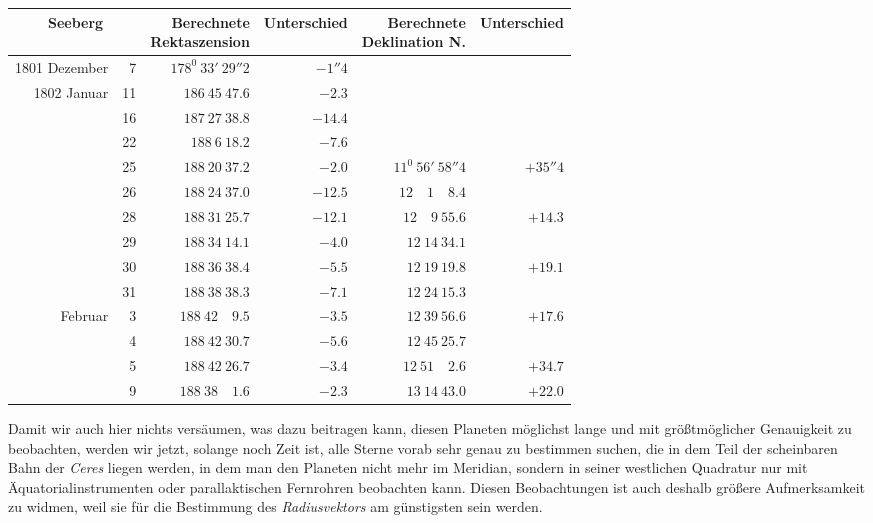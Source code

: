 \begin{center}
{\small\setlength{\tabcolsep}{4pt}
\begin{tabular}{r r|r|r|r|r}
\multicolumn{2}{c|}{Seeberg}&\shortstack{Berechnete\\Rektaszension}&Unterschied&\shortstack{Berechnete\\Deklination N.}&Unterschied\\\hline
1801 Dezember&7&$178^0\ 33'\ 29''2$&$-1''4$&&\\
1802 Januar&11&$186\ 45\ 47.6$&$-2.3$&&\\
&16&$187\ 27\ 38.8$&$-14.4$&&\\
&22&$188\ 6\ 18.2$&$-7.6$&&\\
&25&$188\ 20\ 37.2$&$-2.0$&$11^0\ 56'\ 58''4$&$+35''4$\\
&26&$188\ 24\ 37.0$&$-12.5$&$12\quad1\quad8.4$&\\
&28&$188\ 31\ 25.7$&$-12.1$&$12\quad9\ 55.6$&$+14.3$\\
&29&$188\ 34\ 14.1$&$-4.0$&$12\ 14\ 34.1$&\\
&30&$188\ 36\ 38.4$&$-5.5$&$12\ 19\ 19.8$&$+19.1$\\
&31&$188\ 38\ 38.3$&$-7.1$&$12\ 24\ 15.3$&\\
Februar&3&$188\ 42\quad9.5$&$-3.5$&$12\ 39\ 56.6$&$+17.6$\\
&4&$188\ 42\ 30.7$&$-5.6$&$12\ 45\ 25.7$&\\
&5&$188\ 42\ 26.7$&$-3.4$&$12\ 51\quad2.6$&$+34.7$\\
&9&$188\ 38\quad1.6$&$-2.3$&$13\ 14\ 43.0$&$+22.0$
\end{tabular}}
\end{center}
\expandafter\def\csname HistoricalNoteText18\endcsname{Damit wir auch hier nichts versäumen, was dazu beitragen kann, diesen Planeten möglichst lange und mit größtmöglicher Genauigkeit zu beobachten, werden wir jetzt, solange noch Zeit ist, alle Sterne vorab sehr genau zu bestimmen suchen, die in dem Teil der scheinbaren Bahn der \textit{Ceres} liegen werden, in dem man den Planeten nicht mehr im Meridian, sondern in seiner westlichen Quadratur nur mit Äquatorialinstrumenten oder parallaktischen Fernrohren beobachten kann. Diesen Beobachtungen ist auch deshalb größere Aufmerksamkeit zu widmen, weil sie für die Bestimmung des \textit{Radiusvektors} am günstigsten sein werden.}
%
